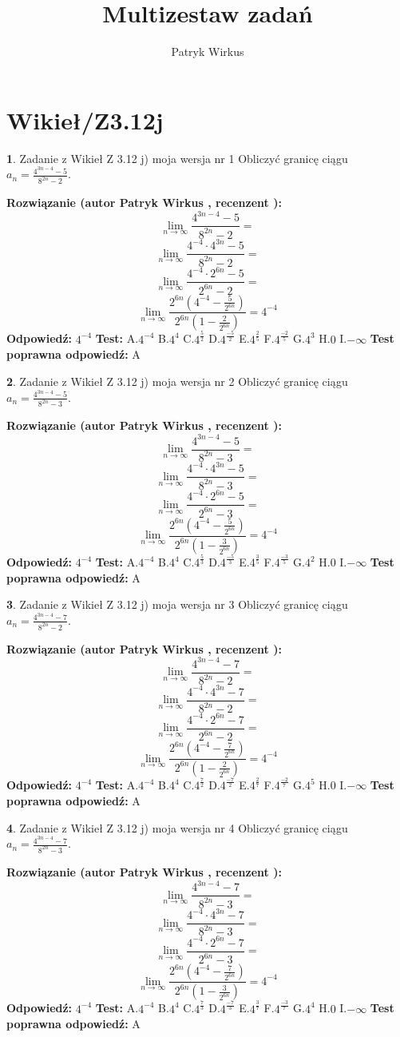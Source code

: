 \documentclass[12pt, a4paper]{article}
\title{Multizestaw zadań}
\author{Patryk Wirkus}
\date{}
\theoremstyle{definition} %
\newtheorem{zad}{}
\newcommand{\kategoria}[1]{\section{#1}}
\newcommand{\zadStart}[1]{\begin{zad}#1\newline}
\newcommand{\zadStop}{\end{zad}}
\newcommand{\rozwStart}[2]{\noindent \textbf{Rozwiązanie (autor #1 , recenzent #2): }\newline}
\newcommand{\rozwStop}{\newline}
\newcommand{\odpStart}{\noindent \textbf{Odpowiedź:}\newline}
\newcommand{\odpStop}{\newline}
\newcommand{\testStart}{\noindent \textbf{Test:}\newline}
\newcommand{\testStop}{\newline}
\newcommand{\kluczStart}{\noindent \textbf{Test poprawna odpowiedź:}\newline}
\newcommand{\kluczStop}{\newline}
\begin{document}
\maketitle

\kategoria{Wikieł/Z3.12j}


\zadStart{Zadanie z Wikieł Z 3.12 j) moja wersja nr 1}
Obliczyć granicę ciągu $a_{n}=\frac{4^{3n-4}-5}{8^{2n}-2}$.
\zadStop
\rozwStart{Patryk Wirkus}{}
$$\lim\limits_{n\to\infty}\frac{4^{3n-4}-5}{8^{2n}-2}=$$
$$\lim\limits_{n\to\infty}\frac{4^{-4} \cdot 4^{3n}-5}{8^{2n}-2}=$$
$$\lim\limits_{n\to\infty}\frac{4^{-4} \cdot 2^{6n}-5}{2^{6n}-2}=$$
$$\lim\limits_{n\to\infty}\frac{2^{6n}(4^{-4} - \frac{5}{2^{6n}})}{2^{6n}(1-\frac{2}{2^{6n}})}= 4^{-4}$$
\rozwStop
\odpStart
$4^{-4}$
\odpStop
\testStart
A.$4^{-4}$
B.$4^{4}$
C.$4^{\frac{5}{2}}$
D.$4^{\frac{-5}{2}}$
E.$4^{\frac{2}{5}}$
F.$4^{\frac{-2}{5}}$
G.$4^{3}$
H.$0$
I.$-\infty$
\testStop
\kluczStart
A
\kluczStop



\zadStart{Zadanie z Wikieł Z 3.12 j) moja wersja nr 2}
Obliczyć granicę ciągu $a_{n}=\frac{4^{3n-4}-5}{8^{2n}-3}$.
\zadStop
\rozwStart{Patryk Wirkus}{}
$$\lim\limits_{n\to\infty}\frac{4^{3n-4}-5}{8^{2n}-3}=$$
$$\lim\limits_{n\to\infty}\frac{4^{-4} \cdot 4^{3n}-5}{8^{2n}-3}=$$
$$\lim\limits_{n\to\infty}\frac{4^{-4} \cdot 2^{6n}-5}{2^{6n}-3}=$$
$$\lim\limits_{n\to\infty}\frac{2^{6n}(4^{-4} - \frac{5}{2^{6n}})}{2^{6n}(1-\frac{3}{2^{6n}})}= 4^{-4}$$
\rozwStop
\odpStart
$4^{-4}$
\odpStop
\testStart
A.$4^{-4}$
B.$4^{4}$
C.$4^{\frac{5}{3}}$
D.$4^{\frac{-5}{3}}$
E.$4^{\frac{3}{5}}$
F.$4^{\frac{-3}{5}}$
G.$4^{2}$
H.$0$
I.$-\infty$
\testStop
\kluczStart
A
\kluczStop



\zadStart{Zadanie z Wikieł Z 3.12 j) moja wersja nr 3}
Obliczyć granicę ciągu $a_{n}=\frac{4^{3n-4}-7}{8^{2n}-2}$.
\zadStop
\rozwStart{Patryk Wirkus}{}
$$\lim\limits_{n\to\infty}\frac{4^{3n-4}-7}{8^{2n}-2}=$$
$$\lim\limits_{n\to\infty}\frac{4^{-4} \cdot 4^{3n}-7}{8^{2n}-2}=$$
$$\lim\limits_{n\to\infty}\frac{4^{-4} \cdot 2^{6n}-7}{2^{6n}-2}=$$
$$\lim\limits_{n\to\infty}\frac{2^{6n}(4^{-4} - \frac{7}{2^{6n}})}{2^{6n}(1-\frac{2}{2^{6n}})}= 4^{-4}$$
\rozwStop
\odpStart
$4^{-4}$
\odpStop
\testStart
A.$4^{-4}$
B.$4^{4}$
C.$4^{\frac{7}{2}}$
D.$4^{\frac{-7}{2}}$
E.$4^{\frac{2}{7}}$
F.$4^{\frac{-2}{7}}$
G.$4^{5}$
H.$0$
I.$-\infty$
\testStop
\kluczStart
A
\kluczStop



\zadStart{Zadanie z Wikieł Z 3.12 j) moja wersja nr 4}
Obliczyć granicę ciągu $a_{n}=\frac{4^{3n-4}-7}{8^{2n}-3}$.
\zadStop
\rozwStart{Patryk Wirkus}{}
$$\lim\limits_{n\to\infty}\frac{4^{3n-4}-7}{8^{2n}-3}=$$
$$\lim\limits_{n\to\infty}\frac{4^{-4} \cdot 4^{3n}-7}{8^{2n}-3}=$$
$$\lim\limits_{n\to\infty}\frac{4^{-4} \cdot 2^{6n}-7}{2^{6n}-3}=$$
$$\lim\limits_{n\to\infty}\frac{2^{6n}(4^{-4} - \frac{7}{2^{6n}})}{2^{6n}(1-\frac{3}{2^{6n}})}= 4^{-4}$$
\rozwStop
\odpStart
$4^{-4}$
\odpStop
\testStart
A.$4^{-4}$
B.$4^{4}$
C.$4^{\frac{7}{3}}$
D.$4^{\frac{-7}{3}}$
E.$4^{\frac{3}{7}}$
F.$4^{\frac{-3}{7}}$
G.$4^{4}$
H.$0$
I.$-\infty$
\testStop
\kluczStart
A
\kluczStop
\end{document}

